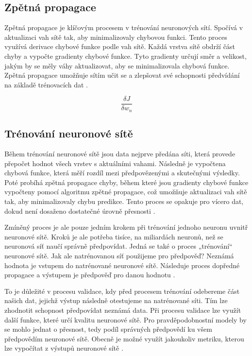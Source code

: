 \documentclass[FM,DP]{tulthesis}
\begin{document}
		\subsection{Zpětná propagace}
		Zpětná propagace je klíčovým procesem v trénování neuronových sítí. Spočívá v aktualizaci vah sítě tak, aby minimalizovaly chybovou funkci. Tento proces využívá derivace chybové funkce podle vah sítě. Každá vrstva sítě obdrží část chyby a vypočte gradienty chybové funkce. Tyto gradienty určují směr a velikost, jakým by se měly váhy aktualizovat, aby se minimalizovala chybová funkce. Zpětná propagace umožňuje sítím učit se a zlepšovat své schopnosti předvídání na základě trénovacích dat \cite{nielsen2015neural} \cite{brilliant}. 
		
		\begin{equation}
			\frac{\delta J}{\delta w_n}
		\end{equation}
		
		\subsection{Trénování neuronové sítě}
		Během trénování neuronové sítě jsou data nejprve předána síti, která provede přepočet hodnot všech vrstev s aktuálními vahami. Následně je vypočtena chybová funkce, která měří rozdíl mezi předpovězenými a skutečnými výsledky. Poté probíhá zpětná propagace chyby, během které jsou gradienty chybové funkce vypočteny pomocí algoritmu zpětné propagace, což umožňuje aktualizaci vah sítě tak, aby minimalizovaly chybu predikce. Tento proces se opakuje pro vícero dat, dokud není dosaženo dostatečné úrovně přesnosti \cite{tds_train}. 
		
		Zmíněný proces je ale pouze jedním krokem při trénování jednoho neuronu uvnitř neuronové sítě. Kroků je ale potřeba tisíce, na miliardách neuronů, než se neuronová síť naučí správně předpovídat. Jedná se také o proces „trénování“ neuronové sítě. Jak ale natrénovanou síť použijeme pro předpověď? Neznámá hodnota je vstupem do natrénované neuronové sítě. Následuje proces dopředné propagace a výstupem je předpověď pro danou hodnotu  \cite{tds_train}. 
		
		To je důležité v procesu validace, kdy před procesem trénování odebereme část našich dat, jejichž výstup následně otestujeme na natrénované síti. Tím lze zhodnotit schopnost předpovídat neznámá data. Při procesu validace lze využít další funkce, které určí kvalitu neuronové sítě. Pro pravděpodobnostní modely by se mohlo jednat o přesnost, tedy podíl správných předpovědí ku všem předpovědím neuronové sítě. Obecně je možné využít jakoukoliv metriku, kterou lze vypočítat z výstupů neuronové sítě \cite{tds_train}.
		
\end{document}
